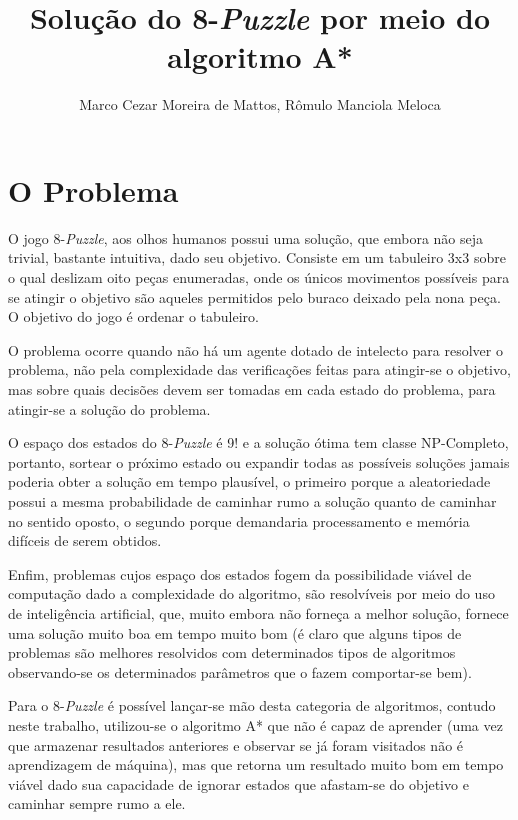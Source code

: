 \documentclass[12pt]{article}
\title{Solução do 8-\textit{Puzzle} por meio do algoritmo A*}
\author{Marco Cezar Moreira de Mattos\inst{1}, Rômulo Manciola Meloca\inst{1}}
\begin{document}
	\maketitle

	\begin{abstract}

	\end{abstract}

	\begin{resumo} 

	\end{resumo}

	\section{O Problema}\label{sec:problema}

		O jogo 8-\textit{Puzzle}, aos olhos humanos possui uma solução, que embora não seja trivial, bastante intuitiva, dado seu objetivo. Consiste em um tabuleiro 3x3 sobre o qual deslizam oito peças enumeradas, onde os únicos movimentos possíveis para se atingir o objetivo são aqueles permitidos pelo buraco deixado pela nona peça. O objetivo do jogo é ordenar o tabuleiro.

		O problema ocorre quando não há um agente dotado de intelecto para resolver o problema, não pela complexidade das verificações feitas para atingir-se o objetivo, mas sobre quais decisões devem ser tomadas em cada estado do problema, para atingir-se a solução do problema.

		O espaço dos estados do 8-\textit{Puzzle} é 9! e a solução ótima tem classe NP-Completo, portanto, sortear o próximo estado ou expandir todas as possíveis soluções jamais poderia obter a solução em tempo plausível, o primeiro porque a aleatoriedade possui a mesma probabilidade de caminhar rumo a solução quanto de caminhar no sentido oposto, o segundo porque demandaria processamento e memória difíceis de serem obtidos.

		Enfim, problemas cujos espaço dos estados fogem da possibilidade viável de computação dado a complexidade do algoritmo, são resolvíveis por meio do uso de inteligência artificial, que, muito embora não forneça a melhor solução, fornece uma solução muito boa em tempo muito bom (é claro que alguns tipos de problemas são melhores resolvidos com determinados tipos de algoritmos observando-se os determinados parâmetros que o fazem comportar-se bem).

		Para o 8-\textit{Puzzle} é possível lançar-se mão desta categoria de algoritmos, contudo neste trabalho, utilizou-se o algoritmo A* que não é capaz de aprender (uma vez que armazenar resultados anteriores e observar se já foram visitados não é aprendizagem de máquina), mas que retorna um resultado muito bom em tempo viável dado sua capacidade de ignorar estados que afastam-se do objetivo e caminhar sempre rumo a ele.
\end{document}
